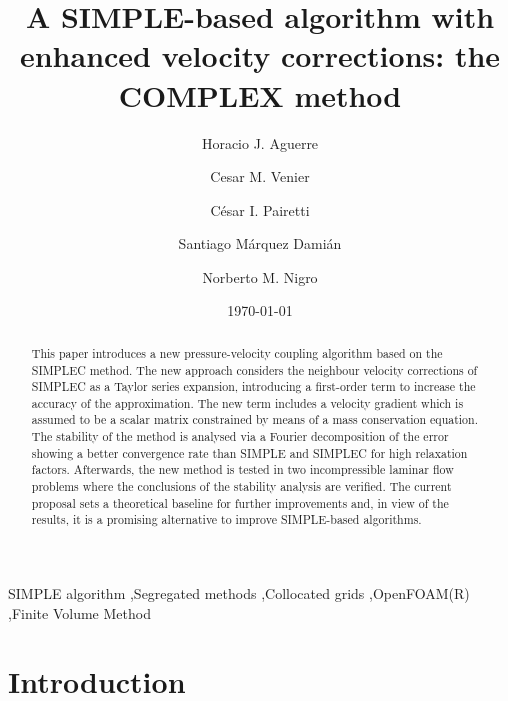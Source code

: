 \documentclass[final,3p,times,11pt,onecolumn]{myElsarticle}
\date{\today}
\numberwithin{equation}{section}
\begin{document}
\begin{frontmatter}

\title{A SIMPLE-based algorithm with enhanced velocity corrections: the COMPLEX method}
 
\author[a]{Horacio J. Aguerre}
\author[a,b]{Cesar M. Venier}
\author[b,a]{C\'{e}sar I. Pairetti}
\author[a,c]{Santiago M\'{a}rquez Dami\'{a}n}
\author[a,d]{Norberto M. Nigro}

\address[a]{Centro de Investigación de Métodos Computacionales, CONICET-UNL, Santa Fe, Argentina}
\address[b]{Escuela de Ingeniería Mecánica, Facultad de Ciencias Exactas, Ingeniería y Agrimensura, Universidad Nacional de Rosario, Rosario, Argentina}
\address[c]{Facultad Regional Santa Fe, Universidad Tecnológica Nacional, Santa Fe, Argentina}
\address[d]{Facultad de Ingeniería y Ciencias Hídricas, Universidad Nacional del Litoral, Santa Fe, Argentina}

\begin{abstract}
This paper introduces a new pressure-velocity coupling algorithm based on the SIMPLEC method. The new approach considers the neighbour velocity corrections of SIMPLEC as a Taylor series expansion, introducing a first-order term to increase the accuracy of the approximation. The new term includes a velocity gradient which is assumed to be a scalar matrix constrained by means of a mass conservation equation.
The stability of the method is analysed via a Fourier decomposition of the error showing a better convergence rate than SIMPLE and SIMPLEC for high relaxation factors. Afterwards, the new method is tested in two incompressible laminar flow problems where the conclusions of the stability analysis are verified. The current proposal sets a theoretical baseline for further improvements and, in view of the results, it is a promising alternative to improve SIMPLE-based algorithms.
\end{abstract}

\begin{keyword}
SIMPLE algorithm \sep Segregated methods \sep Collocated grids
\sep OpenFOAM(R) \sep Finite Volume Method 
\end{keyword}
\end{frontmatter}

\section{Introduction}
\end{document}

